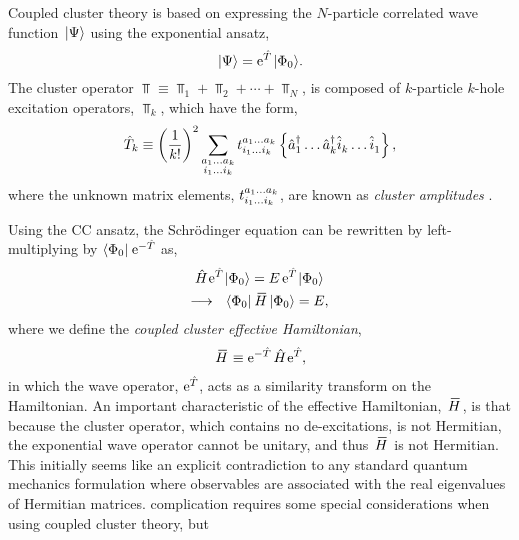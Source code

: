 \documentclass[thesis.tex]{subfiles}
\begin{document}
Coupled cluster theory is based on expressing the $N$-particle correlated wave function $\hspace{1pt}\lvert \Psi \rangle$ using the exponential ansatz,
\begin{equation} \label{eq:cc_ansatz}
  \hspace{1pt}\lvert \Psi \rangle = \operatorname{e}^{\hat{T}}\hspace{1pt}\lvert \Phi_{0} \rangle.
\end{equation}
The cluster operator $\Top \equiv \Top_{1} + \Top_{2} + \cdots + \Top_{N}$, is composed of $k$-particle $k$-hole excitation operators, $\Top_{k}$, which have the form,
\begin{equation} \label{eq:cc_amps}
  \hat{T}_{k} \equiv \left(\frac{1}{k!}\right)^2 \sum_{\substack{a_1 \ldots a_k \\ i_1 \ldots i_k}} t^{a_1 \ldots a_k}_{i_1 \ldots i_k}\left\{\hat{a}_{1}^\dagger \ldots \hat{a}_{k}^\dagger \hat{i}_{k}^{} \ldots \hat{i}_{1}^{}\right\},
\end{equation}
where the unknown matrix elements, $t^{a_1 \ldots a_k}_{i_1 \ldots i_k}$, are known as \textit{cluster amplitudes} \cite{SHAVITT2009}.

Using the CC ansatz, the Schr\"odinger equation can be rewritten by left-multiplying by $\langle \Phi_{0} |\hspace{1pt} \operatorname{e}^{-\hat{T}\hspace{-0.25pt}}$ as,
\begin{gather} \label{eq:cc_schrodeq}
  \Ham \E^{\Top} \refket = E \E^{\Top} \refket \notag \\
  \longrightarrow \ \ \refbra\EHam\refket = E,
\end{gather}
where we define the \textit{coupled cluster effective Hamiltonian},
\begin{align} \label{eq:cc_heff0}
  \EHam \equiv \E^{-\Top} \Ham \E^{\Top},
\end{align}
in which the wave operator, $\operatorname{e}^{\hat{T}\hspace{-0.25pt}}$, acts as a similarity transform on the Hamiltonian.  An important characteristic of the effective Hamiltonian, $\EHam$, is that because the cluster operator, which contains no de-excitations, is not Hermitian, the exponential wave operator cannot be unitary, and thus $\EHam$ is not Hermitian.  This initially seems like an explicit contradiction to any standard quantum mechanics formulation where observables are associated with the real eigenvalues of Hermitian matrices. complication requires some special considerations when using coupled cluster theory, but 
\end{document}
